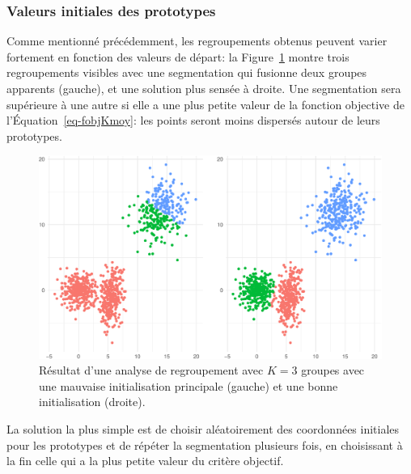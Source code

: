 \documentclass[
  11pt,
  letterpaper,
]{scrbook}
\theoremstyle{definition}
\theoremstyle{remark}
\begin{document}
\hypertarget{valeurs-initiales-des-prototypes}{%
\subsubsection*{Valeurs initiales des
prototypes}\label{valeurs-initiales-des-prototypes}}

Comme mentionné précédemment, les regroupements obtenus peuvent varier
fortement en fonction des valeurs de départ: la
Figure~\ref{fig-kmoyenne-mauvais} montre trois regroupements visibles
avec une segmentation qui fusionne deux groupes apparents (gauche), et
une solution plus sensée à droite. Une segmentation sera supérieure à
une autre si elle a une plus petite valeur de la fonction objective de
l'Équation~\ref{eq-fobjKmoy}: les points seront moins dispersés autour
de leurs prototypes.

\begin{figure}[ht!]

{\centering \includegraphics[width=1\textwidth,height=\textheight]{./03-regroupements_files/figure-pdf/fig-kmoyenne-mauvais-1.pdf}

}

\caption{\label{fig-kmoyenne-mauvais}Résultat d'une analyse de
regroupement avec \(K=3\) groupes avec une mauvaise initialisation
principale (gauche) et une bonne initialisation (droite).}

\end{figure}

La solution la plus simple est de choisir aléatoirement des coordonnées
initiales pour les prototypes et de répéter la segmentation plusieurs
fois, en choisissant à la fin celle qui a la plus petite valeur du
critère objectif.
\end{document}
